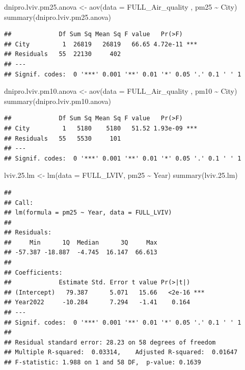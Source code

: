 \documentclass[
  12pt,
]{article}
\newenvironment{Shaded}{\begin{snugshade}}{\end{snugshade}}
\newcommand{\AttributeTok}[1]{\textcolor[rgb]{0.77,0.63,0.00}{#1}}
\newcommand{\FloatTok}[1]{\textcolor[rgb]{0.00,0.00,0.81}{#1}}
\newcommand{\FunctionTok}[1]{\textcolor[rgb]{0.00,0.00,0.00}{#1}}
\newcommand{\NormalTok}[1]{#1}
\newcommand{\OtherTok}[1]{\textcolor[rgb]{0.56,0.35,0.01}{#1}}
\newcommand{\SpecialCharTok}[1]{\textcolor[rgb]{0.00,0.00,0.00}{#1}}
\begin{document}
\begin{Shaded}
\begin{Highlighting}[]
\NormalTok{dnipro.lviv.pm25.anova }\OtherTok{\textless{}{-}} \FunctionTok{aov}\NormalTok{(}\AttributeTok{data =}\NormalTok{ FULL\_Air\_quality , pm25 }\SpecialCharTok{\textasciitilde{}}\NormalTok{ City)}
\FunctionTok{summary}\NormalTok{(dnipro.lviv.pm25.anova)}
\end{Highlighting}
\end{Shaded}

\begin{verbatim}
##             Df Sum Sq Mean Sq F value   Pr(>F)    
## City         1  26819   26819   66.65 4.72e-11 ***
## Residuals   55  22130     402                     
## ---
## Signif. codes:  0 '***' 0.001 '**' 0.01 '*' 0.05 '.' 0.1 ' ' 1
\end{verbatim}

\begin{Shaded}
\begin{Highlighting}[]
\NormalTok{dnipro.lviv.pm10.anova }\OtherTok{\textless{}{-}} \FunctionTok{aov}\NormalTok{(}\AttributeTok{data =}\NormalTok{ FULL\_Air\_quality , pm10 }\SpecialCharTok{\textasciitilde{}}\NormalTok{ City)}
\FunctionTok{summary}\NormalTok{(dnipro.lviv.pm10.anova)}
\end{Highlighting}
\end{Shaded}

\begin{verbatim}
##             Df Sum Sq Mean Sq F value   Pr(>F)    
## City         1   5180    5180   51.52 1.93e-09 ***
## Residuals   55   5530     101                     
## ---
## Signif. codes:  0 '***' 0.001 '**' 0.01 '*' 0.05 '.' 0.1 ' ' 1
\end{verbatim}

\begin{Shaded}
\begin{Highlighting}[]
\NormalTok{lviv.}\FloatTok{25.}\NormalTok{lm }\OtherTok{\textless{}{-}} \FunctionTok{lm}\NormalTok{(}\AttributeTok{data =}\NormalTok{ FULL\_LVIV, pm25 }\SpecialCharTok{\textasciitilde{}}\NormalTok{ Year) }
\FunctionTok{summary}\NormalTok{(lviv.}\FloatTok{25.}\NormalTok{lm) }
\end{Highlighting}
\end{Shaded}

\begin{verbatim}
## 
## Call:
## lm(formula = pm25 ~ Year, data = FULL_LVIV)
## 
## Residuals:
##     Min      1Q  Median      3Q     Max 
## -57.387 -18.887  -4.745  16.147  66.613 
## 
## Coefficients:
##             Estimate Std. Error t value Pr(>|t|)    
## (Intercept)   79.387      5.071   15.66   <2e-16 ***
## Year2022     -10.284      7.294   -1.41    0.164    
## ---
## Signif. codes:  0 '***' 0.001 '**' 0.01 '*' 0.05 '.' 0.1 ' ' 1
## 
## Residual standard error: 28.23 on 58 degrees of freedom
## Multiple R-squared:  0.03314,    Adjusted R-squared:  0.01647 
## F-statistic: 1.988 on 1 and 58 DF,  p-value: 0.1639
\end{verbatim}
\end{document}
